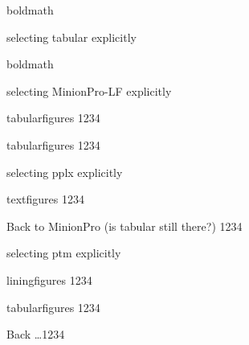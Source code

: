 \documentclass[a4paper]{article}
\begin{document}
\bigskip
\begingroup
\boldmath boldmath \showmath\par
{} selecting tabular explicitly \showmath\par
\boldmath boldmath \showmath\par
\endgroup

\bigskip
\begingroup
{}\selectfont selecting MinionPro-LF explicitly \showfont\par
\tbfigures tabularfigures 1234 \showfont\par
\endgroup

\bigskip
\begingroup
\tbfigures tabularfigures 1234 \showfont\par
{}\selectfont selecting pplx explicitly \showfont\par
\txfigures textfigures 1234 \showfont\par
{}\selectfont
Back to MinionPro (is tabular still there?) 1234 \showfont\par
{}\selectfont selecting ptm explicitly \showfont\par
\lnfigures liningfigures 1234 \showfont\par
\tbfigures tabularfigures 1234 \showfont\par
{}\selectfont Back \dots 1234 \showfont\par
\endgroup
\end{document}
